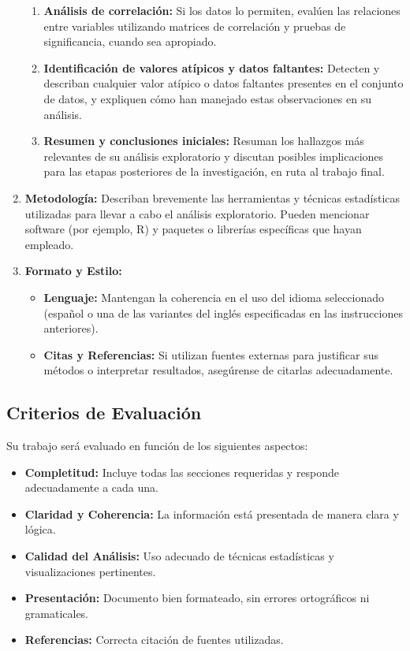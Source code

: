 \documentclass[11pt]{article}
\begin{document}
\begin{enumerate}
\begin{enumerate}
    \item \textbf{Análisis de correlación:} Si los datos lo permiten, evalúen las relaciones entre variables utilizando matrices de correlación y pruebas de significancia, cuando sea apropiado.

    \item \textbf{Identificación de valores atípicos y datos faltantes:} Detecten y describan cualquier valor atípico o datos faltantes presentes en el conjunto de datos, y expliquen cómo han manejado estas observaciones en su análisis.

    \item \textbf{Resumen y conclusiones iniciales:} Resuman los hallazgos más relevantes de su análisis exploratorio y discutan posibles implicaciones para las etapas posteriores de la investigación, en ruta al trabajo final.
\end{enumerate}

\item \textbf{Metodología:} Describan brevemente las herramientas y técnicas estadísticas utilizadas para llevar a cabo el análisis exploratorio. Pueden mencionar software (por ejemplo, R) y paquetes o librerías específicas que hayan empleado.

\item \textbf{Formato y Estilo:}
\begin{itemize}
    \item \textbf{Lenguaje:} Mantengan la coherencia en el uso del idioma seleccionado (español o una de las variantes del inglés especificadas en las instrucciones anteriores).
    \item \textbf{Citas y Referencias:} Si utilizan fuentes externas para justificar sus métodos o interpretar resultados, asegúrense de citarlas adecuadamente.
\end{itemize}
\end{enumerate}

\subsection*{Criterios de Evaluación}

Su trabajo será evaluado en función de los siguientes aspectos:

\begin{itemize}
\item \textbf{Completitud:} Incluye todas las secciones requeridas y responde adecuadamente a cada una.
\item \textbf{Claridad y Coherencia:} La información está presentada de manera clara y lógica.
\item \textbf{Calidad del Análisis:} Uso adecuado de técnicas estadísticas y visualizaciones pertinentes.
\item \textbf{Presentación:} Documento bien formateado, sin errores ortográficos ni gramaticales.
\item \textbf{Referencias:} Correcta citación de fuentes utilizadas.
\end{itemize}
\end{document}
